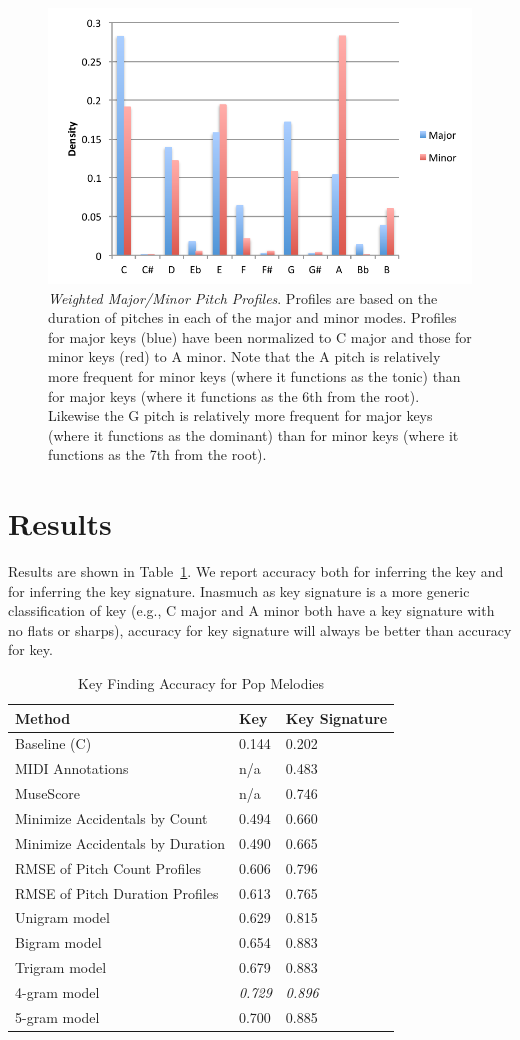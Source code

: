 \documentclass[letterpaper]{article}
\begin{document}
\begin{figure}
  \centering
 \includegraphics[width=.5\textwidth]{./PitchProfilesWeighted.pdf}
  \caption{\emph{Weighted Major/Minor Pitch Profiles}. Profiles are based on the duration of pitches in each of the major and minor modes. Profiles for major keys (blue) have been normalized to C major and those for minor keys (red) to A minor. Note that the A pitch is relatively more frequent for minor keys (where it functions as the tonic) than for major keys (where it functions as the 6th from the root). Likewise the G pitch is relatively more frequent for major keys (where it functions as the dominant) than for minor keys (where it functions as the 7th from the root).}
  \label{fig:pitch_profiles}
\end{figure}

\section{Results}

Results are shown in Table~\ref{tab:results}. We report accuracy both for inferring the key and for inferring the key signature. Inasmuch as key signature is a more generic classification of key (e.g., C major and A minor both have a key signature with no flats or sharps), accuracy for key signature will always be better than accuracy for key.
\begin{table}[]
\centering
\caption{Key Finding Accuracy for Pop Melodies}
\label{tab:results}
\begin{tabular}{@{}lll@{}}
\toprule
Method & Key & Key Signature \\ \midrule
Baseline (C)	&	0.144 	&	0.202 \\
MIDI	Annotations		&	n/a		&	0.483 \\
MuseScore	&	n/a		&	0.746 \\ \midrule
Minimize Accidentals	 by Count	&	0.494 &		0.660 \\
Minimize Accidentals	 by Duration	&	0.490 &		0.665 \\
RMSE of Pitch Count Profiles	&	0.606	&	0.796	\\
RMSE of Pitch Duration Profiles	&	0.613	&	0.765	\\ \midrule
Unigram model    	&	0.629	& 0.815       \\
Bigram model		&	0.654	&	0.883	\\
Trigram model		&	0.679	&	0.883	\\
4-gram model		&	\emph{0.729} &	\emph{0.896}	\\
5-gram model		&	0.700 &	0.885              \\ \bottomrule
\end{tabular}
\end{table}
\end{document}
